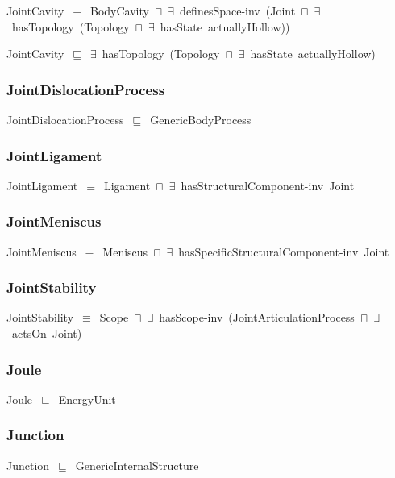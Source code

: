 \documentclass{article}
\begin{document}
JointCavity~\ensuremath{\equiv}~BodyCavity~\ensuremath{\sqcap}~\ensuremath{\exists}~definesSpace-inv~(Joint~\ensuremath{\sqcap}~\ensuremath{\exists}~hasTopology~(Topology~\ensuremath{\sqcap}~\ensuremath{\exists}~hasState~actuallyHollow))

JointCavity~\ensuremath{\sqsubseteq}~\ensuremath{\exists}~hasTopology~(Topology~\ensuremath{\sqcap}~\ensuremath{\exists}~hasState~actuallyHollow)~

\subsubsection*{JointDislocationProcess}

JointDislocationProcess~\ensuremath{\sqsubseteq}~GenericBodyProcess~

\subsubsection*{JointLigament}

JointLigament~\ensuremath{\equiv}~Ligament~\ensuremath{\sqcap}~\ensuremath{\exists}~hasStructuralComponent-inv~Joint

\subsubsection*{JointMeniscus}

JointMeniscus~\ensuremath{\equiv}~Meniscus~\ensuremath{\sqcap}~\ensuremath{\exists}~hasSpecificStructuralComponent-inv~Joint

\subsubsection*{JointStability}

JointStability~\ensuremath{\equiv}~Scope~\ensuremath{\sqcap}~\ensuremath{\exists}~hasScope-inv~(JointArticulationProcess~\ensuremath{\sqcap}~\ensuremath{\exists}~actsOn~Joint)

\subsubsection*{Joule}

Joule~\ensuremath{\sqsubseteq}~EnergyUnit~

\subsubsection*{Junction}

Junction~\ensuremath{\sqsubseteq}~GenericInternalStructure~
\end{document}
